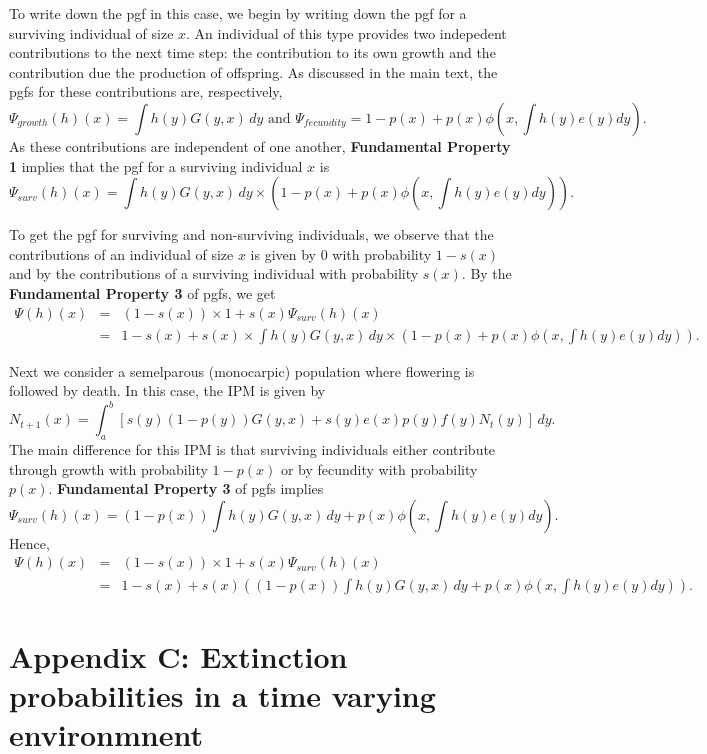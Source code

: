 \documentclass[12pt]{amsart}\usepackage[]{graphicx}\usepackage[]{color}
\begin{document}
To write down the pgf in this case, we begin by writing down the pgf for a surviving individual of size $x$. An individual of this type provides two indepedent contributions to the next time step: the contribution to its own growth and the contribution due the production of offspring. As discussed in the main text, the pgfs for these contributions are, respectively, 
\[
\Psi_{growth}(h)(x)=\int h(y) G(y,x)\,dy \mbox{ and } \Psi_{fecundity}=1-p(x)+p(x)\phi(x,\int h(y)e(y)dy).
\]
As these contributions are independent of one another, \textbf{Fundamental Property 1} implies that the pgf for a surviving individual $x$ is  
\[
\Psi_{surv}(h)(x)=\int h(y) G(y,x)\,dy \times \left(1-p(x)+p(x)\phi(x,\int h(y)e(y)dy)\right). 
\]

To get the pgf for surviving and non-surviving individuals, we observe that the contributions of an individual of size $x$ is given by $0$ with probability $1-s(x)$ and by the contributions of a surviving individual with probability $s(x)$. By the \textbf{Fundamental Property 3} of pgfs, we get 
\begin{eqnarray*}
\Psi (h)(x)&=&(1-s(x))\times 1+s(x)\Psi_{surv}(h)(x)\\
&=& 1-s(x)+s(x)\times \int h(y) G(y,x)\,dy \times \left(1-p(x)+p(x)\phi(x,\int h(y)e(y)dy)\right).
\end{eqnarray*}

Next we consider a semelparous (monocarpic) population where flowering is followed by death. In this case, the IPM is given by 
\[
N_{t+1}(x)=\int_a^b \left[ s(y)(1-p(y))G(y, x)+s(y)e(x)p(y)f(y)N_t(y)\right]\, dy.
\]
The main difference for this IPM is that surviving individuals either contribute through growth with probability $1-p(x)$ or by fecundity with probability $p(x)$. \textbf{Fundamental Property 3} of pgfs implies 
\[
\Psi_{surv}(h)(x)=(1-p(x))\int h(y) G(y,x)\,dy +p(x)\phi(x,\int h(y)e(y)dy). 
\]
Hence, 
\begin{eqnarray*}
\Psi (h)(x)&=&(1-s(x))\times 1 +s(x)\Psi_{surv}(h)(x)\\
&=& 1-s(x) + s(x)\left((1-p(x))\int h(y) G(y,x)\,dy +p(x)\phi(x,\int h(y)e(y)dy)\right). 
\end{eqnarray*}

\newpage

\section*{Appendix C: Extinction probabilities in a time varying environmnent}
\end{document}

